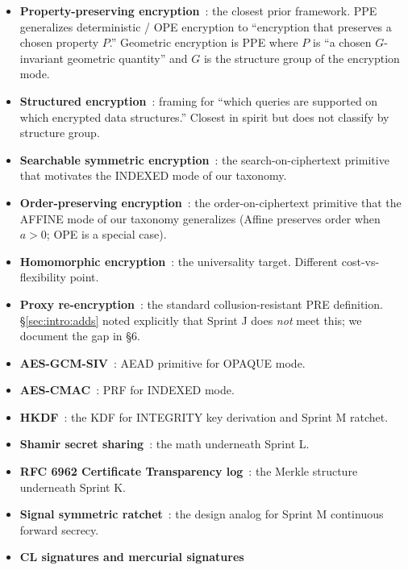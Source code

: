 \documentclass[11pt,letterpaper]{article}
\begin{document}
\begin{itemize}[nosep]
\item \textbf{Property-preserving encryption}~\cite{pandey2012ppe}: the
  closest prior framework. PPE generalizes deterministic / OPE
  encryption to ``encryption that preserves a chosen property $P$.''
  Geometric encryption is PPE where $P$ is ``a chosen $G$-invariant
  geometric quantity'' and $G$ is the structure group of the encryption
  mode.
\item \textbf{Structured encryption}~\cite{chase2010structured}: framing
  for ``which queries are supported on which encrypted data
  structures.'' Closest in spirit but does not classify by structure
  group.
\item \textbf{Searchable symmetric encryption}~\cite{curtmola2006sse}:
  the search-on-ciphertext primitive that motivates the INDEXED mode of
  our taxonomy.
\item \textbf{Order-preserving encryption}~\cite{boldyreva2009ope,popa2011cryptdb}:
  the order-on-ciphertext primitive that the AFFINE mode of our
  taxonomy generalizes (Affine preserves order when $a > 0$; OPE is a
  special case).
\item \textbf{Homomorphic encryption}~\cite{gentry2009fhe,bgv2012,ckks2017}:
  the universality target. Different cost-vs-flexibility point.
\item \textbf{Proxy re-encryption}~\cite{ateniese2005pre,libert2008pre}:
  the standard collusion-resistant PRE definition. \S\ref{sec:intro:adds}
  noted explicitly that Sprint J does \emph{not} meet this; we
  document the gap in \S 6.
\item \textbf{AES-GCM-SIV}~\cite{rfc8452}: AEAD primitive for OPAQUE
  mode.
\item \textbf{AES-CMAC}~\cite{nist-sp800-38b}: PRF for INDEXED mode.
\item \textbf{HKDF}~\cite{krawczyk2010hkdf,rfc5869}: the KDF for
  INTEGRITY key derivation and Sprint M ratchet.
\item \textbf{Shamir secret sharing}~\cite{shamir1979}: the math
  underneath Sprint L.
\item \textbf{RFC 6962 Certificate Transparency
  log}~\cite{rfc6962}: the Merkle structure underneath Sprint K.
\item \textbf{Signal symmetric
  ratchet}~\cite{marlinspike2016signal}: the design analog for Sprint M
  continuous forward secrecy.
\item \textbf{CL signatures and mercurial
  signatures}~\cite{camenisch2004clsigs, camenisch2019mercurial,
}
\end{itemize}
\end{document}
